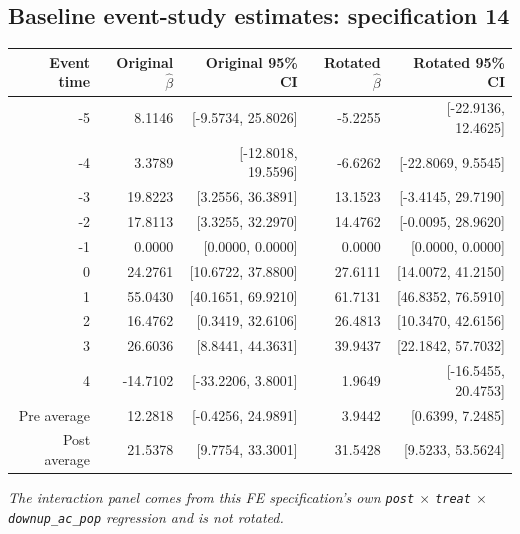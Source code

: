 \documentclass[10pt]{article}
\begin{document}
\subsection*{Baseline event-study estimates: specification 14}
\begin{center}
\scriptsize
\begin{tabular}{r rr rr}
\toprule
Event time & Original $\hat\beta$ & Original 95\% CI & Rotated $\hat\beta$ & Rotated 95\% CI \\
\midrule
-5 & 8.1146 & [-9.5734, 25.8026] & -5.2255 & [-22.9136, 12.4625] \\
-4 & 3.3789 & [-12.8018, 19.5596] & -6.6262 & [-22.8069, 9.5545] \\
-3 & 19.8223 & [3.2556, 36.3891] & 13.1523 & [-3.4145, 29.7190] \\
-2 & 17.8113 & [3.3255, 32.2970] & 14.4762 & [-0.0095, 28.9620] \\
-1 & 0.0000 & [0.0000, 0.0000] & 0.0000 & [0.0000, 0.0000] \\
0 & 24.2761 & [10.6722, 37.8800] & 27.6111 & [14.0072, 41.2150] \\
1 & 55.0430 & [40.1651, 69.9210] & 61.7131 & [46.8352, 76.5910] \\
2 & 16.4762 & [0.3419, 32.6106] & 26.4813 & [10.3470, 42.6156] \\
3 & 26.6036 & [8.8441, 44.3631] & 39.9437 & [22.1842, 57.7032] \\
4 & -14.7102 & [-33.2206, 3.8001] & 1.9649 & [-16.5455, 20.4753] \\
\midrule
Pre average & 12.2818 & [-0.4256, 24.9891] & 3.9442 & [0.6399, 7.2485] \\
Post average & 21.5378 & [9.7754, 33.3001] & 31.5428 & [9.5233, 53.5624] \\
\bottomrule
\end{tabular}
\end{center}
\medskip
\textit{The interaction panel comes from this FE specification's own \texttt{post} $\times$ \texttt{treat} $\times$ \texttt{downup\_ac\_pop} regression and is not rotated.}
\clearpage
\end{document}
